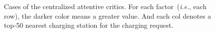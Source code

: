 \documentclass[sigconf]{acmart}
\newcommand{\ie}{\emph{i.e.},\xspace}
\begin{document}
\begin{figure}[t]
\centering
{}
\caption{Cases of the centralized attentive critics. For each factor~(\ie each row), the darker color means a greater value. And each col denotes a top-50 nearest charging station for the charging request.}
\label{fig:case_attention}
\end{figure} 

% 
\end{document}
